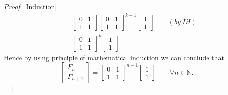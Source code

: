 \documentclass[paper=a4, fontsize=11pt,twoside]{scrartcl}		%
\theoremstyle{definition}
\theoremstyle{remark}
\begin{document}
\begin{proof}{[Induction]}
\begin{align*}
&= \left[ \begin{matrix} 0   & 1 \\ 1  & 1 \end{matrix}\right] \left[ \begin{matrix} 0   & 1 \\ 1  & 1 \end{matrix}\right]^{k-1} \left[\begin{matrix} 1\\ 1\end{matrix}\right] \qquad (by~IH)\\
&= \left[ \begin{matrix} 0   & 1 \\ 1  & 1 \end{matrix}\right]^{k} \left[\begin{matrix} 1\\ 1\end{matrix}\right]
\end{align*}
Hence by using principle of mathematical induction we can conclude that
$$
\left[\begin{matrix} F_n\\ F_{n+1} \end{matrix}\right] = \left[ \begin{matrix} 0   & 1 \\ 1  & 1 \end{matrix}\right]^{n-1} \left[\begin{matrix} 1\\ 1 \end{matrix}\right]\qquad \forall n\in \mathbb{N}.
$$
\end{proof}
\end{document}
